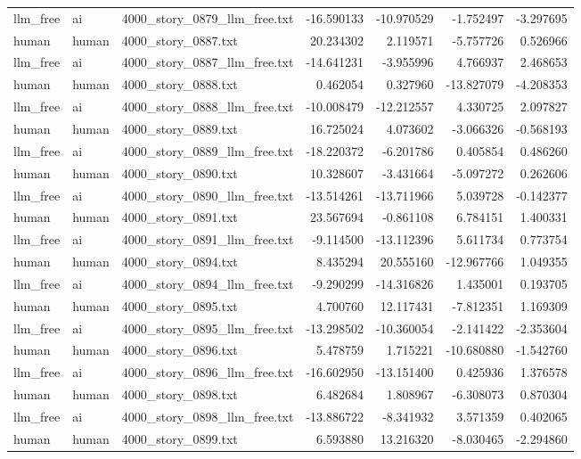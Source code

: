 \begin{longtable}{lllrrrr}
llm\_free & ai & 4000\_story\_0879\_llm\_free.txt & -16.590133 & -10.970529 & -1.752497 & -3.297695 \\
human & human & 4000\_story\_0887.txt & 20.234302 & 2.119571 & -5.757726 & 0.526966 \\
llm\_free & ai & 4000\_story\_0887\_llm\_free.txt & -14.641231 & -3.955996 & 4.766937 & 2.468653 \\
human & human & 4000\_story\_0888.txt & 0.462054 & 0.327960 & -13.827079 & -4.208353 \\
llm\_free & ai & 4000\_story\_0888\_llm\_free.txt & -10.008479 & -12.212557 & 4.330725 & 2.097827 \\
human & human & 4000\_story\_0889.txt & 16.725024 & 4.073602 & -3.066326 & -0.568193 \\
llm\_free & ai & 4000\_story\_0889\_llm\_free.txt & -18.220372 & -6.201786 & 0.405854 & 0.486260 \\
human & human & 4000\_story\_0890.txt & 10.328607 & -3.431664 & -5.097272 & 0.262606 \\
llm\_free & ai & 4000\_story\_0890\_llm\_free.txt & -13.514261 & -13.711966 & 5.039728 & -0.142377 \\
human & human & 4000\_story\_0891.txt & 23.567694 & -0.861108 & 6.784151 & 1.400331 \\
llm\_free & ai & 4000\_story\_0891\_llm\_free.txt & -9.114500 & -13.112396 & 5.611734 & 0.773754 \\
human & human & 4000\_story\_0894.txt & 8.435294 & 20.555160 & -12.967766 & 1.049355 \\
llm\_free & ai & 4000\_story\_0894\_llm\_free.txt & -9.290299 & -14.316826 & 1.435001 & 0.193705 \\
human & human & 4000\_story\_0895.txt & 4.700760 & 12.117431 & -7.812351 & 1.169309 \\
llm\_free & ai & 4000\_story\_0895\_llm\_free.txt & -13.298502 & -10.360054 & -2.141422 & -2.353604 \\
human & human & 4000\_story\_0896.txt & 5.478759 & 1.715221 & -10.680880 & -1.542760 \\
llm\_free & ai & 4000\_story\_0896\_llm\_free.txt & -16.602950 & -13.151400 & 0.425936 & 1.376578 \\
human & human & 4000\_story\_0898.txt & 6.482684 & 1.808967 & -6.308073 & 0.870304 \\
llm\_free & ai & 4000\_story\_0898\_llm\_free.txt & -13.886722 & -8.341932 & 3.571359 & 0.402065 \\
human & human & 4000\_story\_0899.txt & 6.593880 & 13.216320 & -8.030465 & -2.294860 \\

\end{longtable}
